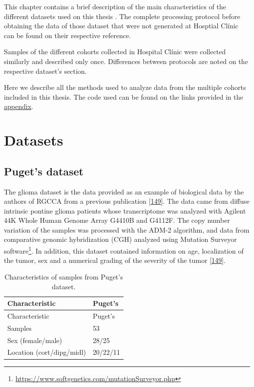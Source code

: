 \documentclass[
  a4paper,
]{book}
\DeclareRobustCommand{\href}[2]{#2\footnote{\url{#1}}}
\begin{document}
This chapter contains a brief description of the main characteristics of the different datasets used on this thesis .
The complete processing protocol before obtaining the data of those dataset that were not generated at Hosptial Clínic can be found on their respective reference.

Samples of the different cohorts collected in Hospital Clínic were collected similarly and described only once.
Differences between protocols are noted on the respective dataset's section.

Here we describe all the methods used to analyze data from the multiple cohorts included in this thesis.
The code used can be found on the links provided in the \protect\hyperlink{software}{appendix}.

\hypertarget{datasets}{%
\section{Datasets}\label{datasets}}

\hypertarget{methods-puget}{%
\subsection{Puget's dataset}\label{methods-puget}}

The glioma dataset is the data provided as an example of biological data by the authors of RGCCA from a previous publication {[}\protect\hyperlink{ref-puget2012}{149}{]}.
The data came from diffuse intrinsic pontine glioma patients whose transcriptome was analyzed with Agilent 44K Whole Human Genome Array G4410B and G4112F.
The copy number variation of the samples was processed with the ADM-2 algorithm, and data from comparative genomic hybridization (CGH) analyzed using \href{https://www.softgenetics.com/mutationSurveyor.php}{Mutation Surveyor software}.
In addition, this dataset contained information on age, localization of the tumor, sex and a numerical grading of the severity of the tumor {[}\protect\hyperlink{ref-puget2012}{149}{]}.

\begin{longtable}[]{@{}ll@{}}
\caption{\label{tab:Puget} Characteristics of samples from Puget's dataset.}\tabularnewline
\toprule
Characteristic & Puget's \\
\midrule
\endfirsthead
\toprule
Characteristic & Puget's \\
\midrule
\endhead
Samples & 53 \\
Sex (female/male) & 28/25 \\
Location (cort/dipg/midl) & 20/22/11 \\
\bottomrule
\end{longtable}
\end{document}
